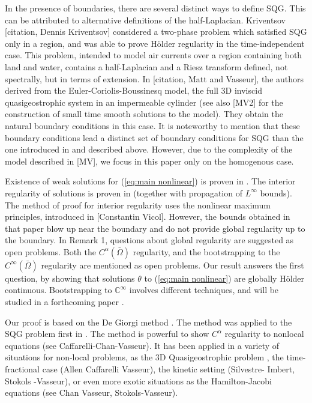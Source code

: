 \documentclass[11pt]{amsart}
\theoremstyle{remark}
\theoremstyle{definition}
\newcommand{\C}{\mathbb{C}}
\begin{document}
In the presence of boundaries, there are several  distinct ways to define SQG. This can be attributed  to alternative definitions of the half-Laplacian.  Kriventsov [citation, Dennis Kriventsov] considered a two-phase problem which satisfied SQG only in a region, and was able to prove H\"{o}lder regularity in the time-independent case.  This problem, intended to model air currents over a region containing both land and water, contains a half-Laplacian and a Riesz transform defined, not spectrally, but in terms of extension.  In [citation, Matt and Vasseur], the authors derived from the Euler-Coriolis-Boussinesq model,   the full 3D inviscid quasigeostrophic system in an impermeable cylinder (see also [MV2] for the construction of small time smooth solutions to the model).  They obtain the natural boundary conditions in this case. It is noteworthy to mention that these boundary conditions lead a distinct set of boundary conditions for  SQG  than the one introduced in  \cite{CoIg.fraclap}  \cite{CoIg.sqg} and described above. 
However, due to the complexity of the model described in [MV], we focus in this paper only on the homogenous case.

\vskip0.3cm
Existence of weak solutions for (\ref{eq:main nonlinear})  is proven in \cite{CoIg.fraclap}. The interior regularity of solutions  is proven in \cite{CoIg.fraclap} (together with propagation of $L^\infty$ bounds).  The method of proof for interior regularity uses the  nonlinear maximum principles, introduced in [Constantin Vicol].   However, the bounds obtained in that paper  blow up near the boundary and do not provide global regularity up to the boundary.
  In \cite{CoIg.sqg} Remark 1, questions about   global regularity are suggested as  open problems.  Both the $C^\alpha(\bar{\Omega})$ regularity,  and the bootstrapping to the  $C^\infty(\bar{\Omega})$ regularity are mentioned as open problems.  %
  Our  result answers the first question, by  showing  that solutions $\theta$ to (\ref{eq:main nonlinear}) are globally H\"{o}lder continuous.
  Bootstrapping to $\C^\infty$ involves different techniques, and will be studied in a forthcoming  paper \cite{StVa.higher}.  
\vskip0.3cm

Our proof is based on  the De Giorgi method \cite{DG}.  The method was applied to the SQG problem first in \cite{CaVa.sqg}.  The method is powerful to show $C^\alpha$ regularity to nonlocal equations (see Caffarelli-Chan-Vasseur). It has been applied in a variety of situations for non-local problems, as the 3D Quasigeostrophic problem \cite{NoVa.qg},   the time-fractional case (Allen Caffarelli Vasseur), the kinetic setting (Silvestre- Imbert, Stokols -Vasseur), or even more exotic situations as the Hamilton-Jacobi equations (see Chan Vasseur, Stokols-Vasseur).  
\vskip0.3cm
\end{document}
